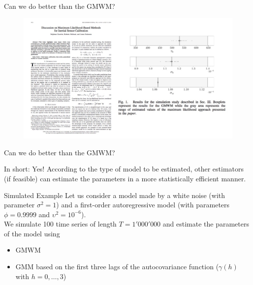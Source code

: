 \documentclass[envcountsect,usenames,dvipsnames]{beamer}
\theoremstyle{mystyle}
\begin{document}
\begin{frame}{Can we do better than the GMWM?}
\vspace{-0.5cm}
    \begin{figure}
    \centering
    \includegraphics[scale = 0.38]{Images/niko2.jpg}
\end{figure}
\end{frame}

\begin{frame}{Can we do better than the GMWM?}

\begin{alertblock}{In short: Yes!}
According to the type of model to be estimated, other estimators (if feasible) can estimate the parameters in a more statistically efficient manner.
\end{alertblock}

\begin{exampleblock}{Simulated Example}
Let us consider a model made by a white noise (with parameter $\sigma^2 = 1$) and a first-order autoregressive model (with parameters $\phi = 0.9999$ and $\upsilon^2 = 10^{-6}$). \\[0.2cm]

We simulate 100 time series of length $T = 1'000'000$ and estimate the parameters of the model using
\begin{itemize}
    \item GMWM
    \item GMM based on the first three lags of the autocovariance function ($\gamma (h)$ with $h = 0,\hdots,3$)
\end{itemize}
\end{exampleblock}

\end{frame}
\end{document}
